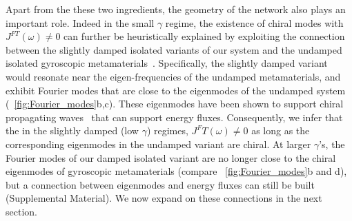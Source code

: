 \documentclass[
 preprint,
 preprintnumbers,
 amsmath,amssymb,
 aps,
 pre,
 longbibliography,
 superscriptaddress,
 10pt, twocolumn
]{revtex4-1}
\begin{document}
Apart from the these two ingredients, the geometry of the network also plays an important role. Indeed in the small $\gamma$ regime, the existence of chiral modes with $J^{FT}(\omega)\neq 0$ can further be heuristically explained by exploiting the connection between the slightly damped isolated variants of our system and the undamped isolated gyroscopic metamaterials~\cite{Nash2015TopologicalMechanics}.
Specifically, the slightly damped variant would resonate near the eigen-frequencies of the undamped metamaterials, and exhibit Fourier modes that are close to the eigenmodes of the undamped system (\figurename~\ref{fig:Fourier_modes}b,c). These eigenmodes have been shown to support chiral propagating waves~\cite{Nash2015TopologicalMechanics} that can support energy fluxes. Consequently, we infer that the in the slightly damped (low $\gamma$) regimes, $J^FT(\omega)\neq 0$ as long as the corresponding eigenmodes in the undamped variant are chiral. At larger $\gamma$'s, the Fourier modes of our damped isolated variant are no longer close to the chiral eigenmodes of gyroscopic metamaterials (compare \figurename~\ref{fig:Fourier_modes}b and d), but a connection between eigenmodes and energy fluxes can still be built (Supplemental Material). We now expand on these connections in the next section. 





\end{document}
